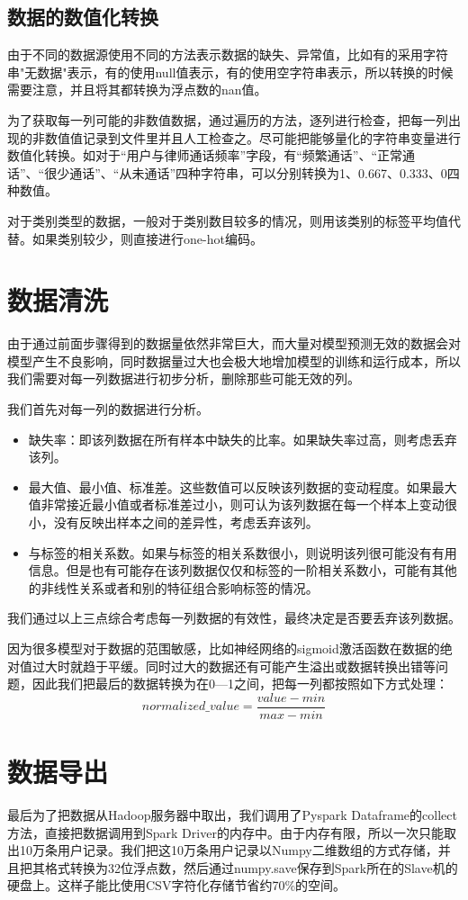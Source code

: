 \subsection{数据的数值化转换}
由于不同的数据源使用不同的方法表示数据的缺失、异常值，比如有的采用字符串"无数据"表示，有的使用null值表示，有的使用空字符串表示，所以转换的时候需要注意，并且将其都转换为浮点数的nan值。

为了获取每一列可能的非数值数据，通过遍历的方法，逐列进行检查，把每一列出现的非数值值记录到文件里并且人工检查之。尽可能把能够量化的字符串变量进行数值化转换。如对于“用户与律师通话频率”字段，有“频繁通话”、“正常通话”、“很少通话”、“从未通话”四种字符串，可以分别转换为1、0.667、0.333、0四种数值。

对于类别类型的数据，一般对于类别数目较多的情况，则用该类别的标签平均值代替。如果类别较少，则直接进行one-hot编码。

\section{数据清洗}
由于通过前面步骤得到的数据量依然非常巨大，而大量对模型预测无效的数据会对模型产生不良影响，同时数据量过大也会极大地增加模型的训练和运行成本，所以我们需要对每一列数据进行初步分析，删除那些可能无效的列。

我们首先对每一列的数据进行分析。
\begin{itemize}
	\item 缺失率：即该列数据在所有样本中缺失的比率。如果缺失率过高，则考虑丢弃该列。
	\item 最大值、最小值、标准差。这些数值可以反映该列数据的变动程度。如果最大值非常接近最小值或者标准差过小，则可认为该列数据在每一个样本上变动很小，没有反映出样本之间的差异性，考虑丢弃该列。
	\item 与标签的相关系数。如果与标签的相关系数很小，则说明该列很可能没有有用信息。但是也有可能存在该列数据仅仅和标签的一阶相关系数小，可能有其他的非线性关系或者和别的特征组合影响标签的情况。
\end{itemize}
我们通过以上三点综合考虑每一列数据的有效性，最终决定是否要丢弃该列数据。

因为很多模型对于数据的范围敏感，比如神经网络的sigmoid激活函数在数据的绝对值过大时就趋于平缓。同时过大的数据还有可能产生溢出或数据转换出错等问题，因此我们把最后的数据转换为在0—1之间，把每一列都按照如下方式处理：
\[normalized\_value = \dfrac{value - min}{max - min}\]

\section{数据导出}
最后为了把数据从Hadoop服务器中取出，我们调用了Pyspark Dataframe的collect方法，直接把数据调用到Spark Driver的内存中。由于内存有限，所以一次只能取出10万条用户记录。我们把这10万条用户记录以Numpy二维数组的方式存储，并且把其格式转换为32位浮点数，然后通过numpy.save保存到Spark所在的Slave机的硬盘上。这样子能比使用CSV字符化存储节省约70\%的空间。